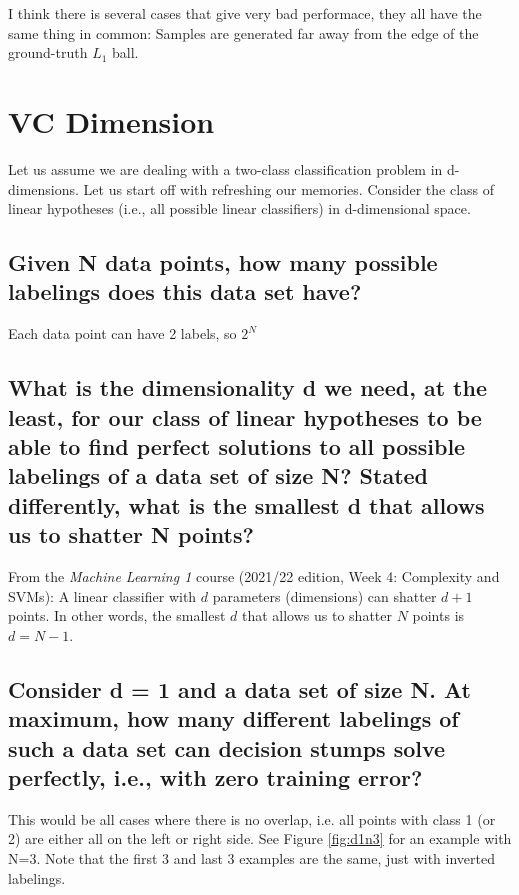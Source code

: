 \documentclass[11pt,a4paper]{article}
\begin{document}
I think there is several cases that give very bad performace, they all have the same thing in common: Samples are generated far away from the edge of the ground-truth $L_1$ ball.

\clearpage
\section{VC Dimension}
\label{sec:VC}
Let us assume we are dealing with a two-class classification problem in d-dimensions.
Let us start off with refreshing our memories. Consider the class of linear hypotheses (i.e.,
all possible linear classifiers) in d-dimensional space.

\subsection{Given N data points, how many possible labelings does this data set have?}
\label{sec:2a}
Each data point can have 2 labels, so $2^N$

\subsection{What is the dimensionality d we need, at the least, for our class of linear hypotheses to
be able to find perfect solutions to all possible labelings of a data set of size N? Stated
differently, what is the smallest d that allows us to shatter N points?}
\label{sec:2b}

From the \textit{Machine Learning 1} course (2021/22 edition, Week 4: Complexity and SVMs): A linear classifier with $d$ parameters (dimensions) can shatter $d+1$ points. In other words, the smallest $d$ that allows us to shatter $N$ points is $d = N - 1$. 

\subsection{Consider d = 1 and a data set of size N. At maximum, how many different labelings of
such a data set can decision stumps solve perfectly, i.e., with zero training error?}
\label{sec:2c}
This would be all cases where there is no overlap, i.e. all points with class 1 (or 2) are either all on the left or right side. See Figure \ref{fig:d1n3} for an example with N=3. Note that the first 3 and last 3 examples are the same, just with inverted labelings.
\end{document}

